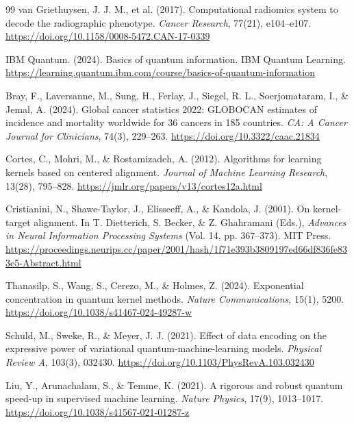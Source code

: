 \begin{thebibliography}{99}
    van Griethuysen, J. J. M., et al. (2017). Computational radiomics system to decode the radiographic phenotype.
    \textit{Cancer Research}, 77(21), e104--e107.
    \url{https://doi.org/10.1158/0008-5472.CAN-17-0339}

  IBM Quantum. (2024). Basics of quantum information.
  IBM Quantum Learning.
  \url{https://learning.quantum.ibm.com/course/basics-of-quantum-information}

    Bray, F., Laversanne, M., Sung, H., Ferlay, J., Siegel, R. L., Soerjomataram, I., \& Jemal, A. (2024).
    Global cancer statistics 2022: GLOBOCAN estimates of incidence and mortality worldwide for 36 cancers in 185 countries.
    \textit{CA: A Cancer Journal for Clinicians}, 74(3), 229--263.
    \url{https://doi.org/10.3322/caac.21834}

  

    Cortes, C., Mohri, M., \& Rostamizadeh, A. (2012).
    Algorithms for learning kernels based on centered alignment.
    \textit{Journal of Machine Learning Research}, 13(28), 795--828.
    \url{https://jmlr.org/papers/v13/cortes12a.html}

    Cristianini, N., Shawe-Taylor, J., Elisseeff, A., \& Kandola, J. (2001).
    On kernel-target alignment. In T. Dietterich, S. Becker, \& Z. Ghahramani (Eds.),
    \textit{Advances in Neural Information Processing Systems} (Vol. 14, pp. 367--373). MIT Press.
    \url{https://proceedings.neurips.cc/paper/2001/hash/1f71e393b3809197ed66df836fe833e5-Abstract.html}

    Thanasilp, S., Wang, S., Cerezo, M., \& Holmes, Z. (2024).
    Exponential concentration in quantum kernel methods.
    \textit{Nature Communications}, 15(1), 5200.
    \url{https://doi.org/10.1038/s41467-024-49287-w}

    Schuld, M., Sweke, R., \& Meyer, J. J. (2021).
    Effect of data encoding on the expressive power of variational quantum-machine-learning models.
    \textit{Physical Review A}, 103(3), 032430.
    \url{https://doi.org/10.1103/PhysRevA.103.032430}

    Liu, Y., Arunachalam, S., \& Temme, K. (2021).
    A rigorous and robust quantum speed-up in supervised machine learning.
    \textit{Nature Physics}, 17(9), 1013--1017.
    \url{https://doi.org/10.1038/s41567-021-01287-z}


\end{thebibliography}
